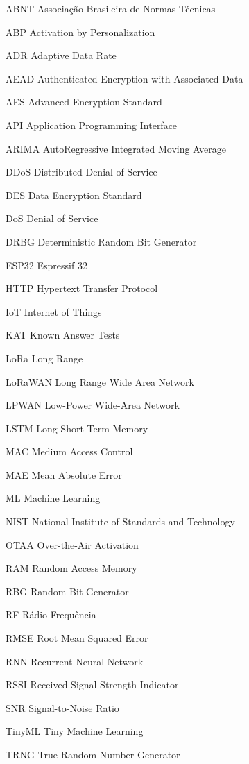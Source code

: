 \documentclass[
	12pt,				%
	openright,			%
	twoside,			%
	a4paper,			%
	english,			%
	brazilian				%
	]{abntex2}
\newcommand{\listofquadrosname}{Lista de quadros}
\begin{document}

\listoftables*
\cleardoublepage

\begin{siglas}
  \item[ABNT] Associação Brasileira de Normas Técnicas
  \item[ABP] Activation by Personalization
  \item[ADR] Adaptive Data Rate
  \item[AEAD] Authenticated Encryption with Associated Data
  \item[AES] Advanced Encryption Standard
  \item[API] Application Programming Interface
  \item[ARIMA] AutoRegressive Integrated Moving Average
  \item[DDoS] Distributed Denial of Service
  \item[DES] Data Encryption Standard
  \item[DoS] Denial of Service
  \item[DRBG] Deterministic Random Bit Generator
  \item[ESP32] Espressif 32
  \item[HTTP] Hypertext Transfer Protocol
  \item[IoT] Internet of Things
  \item[KAT] Known Answer Tests
  \item[LoRa] Long Range
  \item[LoRaWAN] Long Range Wide Area Network
  \item[LPWAN] Low-Power Wide-Area Network
  \item[LSTM] Long Short-Term Memory
  \item[MAC] Medium Access Control
  \item[MAE] Mean Absolute Error
  \item[ML] Machine Learning
  \item[NIST] National Institute of Standards and Technology
  \item[OTAA] Over-the-Air Activation
  \item[RAM] Random Access Memory
  \item[RBG] Random Bit Generator
  \item[RF] Rádio Frequência
  \item[RMSE] Root Mean Squared Error
  \item[RNN] Recurrent Neural Network
  \item[RSSI] Received Signal Strength Indicator
  \item[SNR] Signal-to-Noise Ratio
  \item[TinyML] Tiny Machine Learning
  \item[TRNG] True Random Number Generator
\end{siglas}
\end{document}
